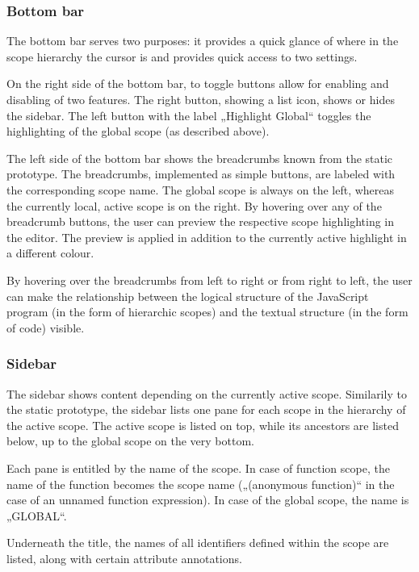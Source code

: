 \subsubsection{Bottom bar}\label{bottom-bar}

The bottom bar serves two purposes: it provides a quick glance of where
in the scope hierarchy the cursor is and provides quick access to two
settings.

On the right side of the bottom bar, to toggle buttons allow for
enabling and disabling of two features. The right button, showing a list
icon, shows or hides the sidebar. The left button with the label
„Highlight Global“ toggles the highlighting of the global scope (as
described above).

The left side of the bottom bar shows the breadcrumbs known from the
static prototype. The breadcrumbs, implemented as simple buttons, are
labeled with the corresponding scope name. The global scope is always on
the left, whereas the currently local, active scope is on the right. By
hovering over any of the breadcrumb buttons, the user can preview the
respective scope highlighting in the editor. The preview is applied in
addition to the currently active highlight in a different colour.

By hovering over the breadcrumbs from left to right or from right to
left, the user can make the relationship between the logical structure
of the JavaScript program (in the form of hierarchic scopes) and the
textual structure (in the form of code) visible.

\subsubsection{Sidebar}\label{sidebar}

The sidebar shows content depending on the currently active scope.
Similarily to the static prototype, the sidebar lists one pane for each
scope in the hierarchy of the active scope. The active scope is listed
on top, while its ancestors are listed below, up to the global scope on
the very bottom.

Each pane is entitled by the name of the scope. In case of function
scope, the name of the function becomes the scope name („(anonymous
function)“ in the case of an unnamed function expression). In case of
the global scope, the name is „GLOBAL“.

Underneath the title, the names of all identifiers defined within the
scope are listed, along with certain attribute annotations.

